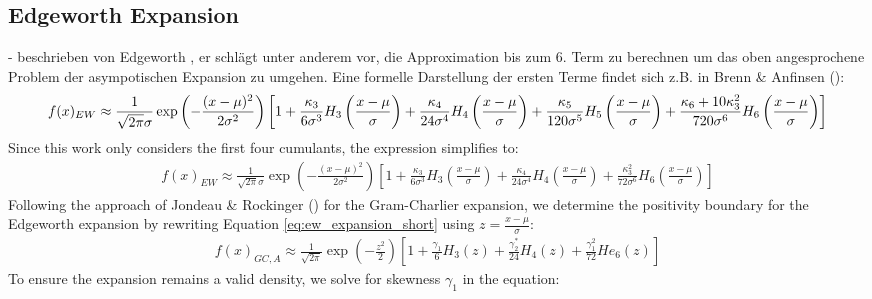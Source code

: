 \subsection{Edgeworth Expansion}
- beschrieben von Edgeworth \citeyear{edgeworthRepresentationStatisticalFrequency1907}, er schlägt unter anderem vor, die Approximation bis zum 6. Term zu berechnen um das oben angesprochene Problem der asympotischen Expansion zu umgehen. Eine formelle Darstellung der ersten Terme findet sich z.B. in Brenn & Anfinsen (\citeyear{brennRevisitGramCharlierEdgeworth2017}):
\begin{align}
    f(x)_{EW} \approx \frac{1}{\sqrt{2\pi}\sigma}\exp\left(-\frac{(x-\mu)^2}{2\sigma^2}\right) \left[1 + \frac{\kappa_3}{6\sigma^3}H_3\left(\frac{x-\mu}{\sigma}\right) + \frac{\kappa_4}{24\sigma^4}H_4\left(\frac{x-\mu}{\sigma}\right) + \frac{\kappa_5}{120\sigma^5}H_5\left(\frac{x-\mu}{\sigma}\right) + \frac{\kappa_6 + 10\kappa_3^2}{720\sigma^6}H_6\left(\frac{x-\mu}{\sigma}\right)\right] \notag
\end{align}
Since this work only considers the first four cumulants, the expression simplifies to:
\begin{align}
    \label{eq:ew_expansion_short}
    f(x)_{EW} \approx \frac{1}{\sqrt{2\pi}\sigma}\exp\left(-\frac{(x-\mu)^2}{2\sigma^2}\right) \left[1 + \frac{\kappa_3}{6\sigma^3}H_3\left(\frac{x-\mu}{\sigma}\right) + \frac{\kappa_4}{24\sigma^4}H_4\left(\frac{x-\mu}{\sigma}\right) + \frac{\kappa_3^2}{72\sigma^6}H_6\left(\frac{x-\mu}{\sigma}\right)\right]
\end{align}
Following the approach of Jondeau & Rockinger (\citeyear{jondeauGramCharlierDensities2001}) for the Gram-Charlier expansion, we determine the positivity boundary for the Edgeworth expansion by rewriting Equation \eqref{eq:ew_expansion_short} using $z = \frac{x-\mu}{\sigma}$:
\begin{align}
    \label{eq:ew_expansion_s_ek}
    f(x)_{GC,A} \approx \frac{1}{\sqrt{2\pi}}\exp\left(-\frac{z^2}{2}\right) \left[1 + \frac{\gamma_1}{6}H_3(z) + \frac{\gamma_2^*}{24}H_4(z) + \frac{\gamma_1^2}{72}He_6(z)\right]
\end{align}
To ensure the expansion remains a valid density, we solve for skewness $\gamma_1$ in the equation:
